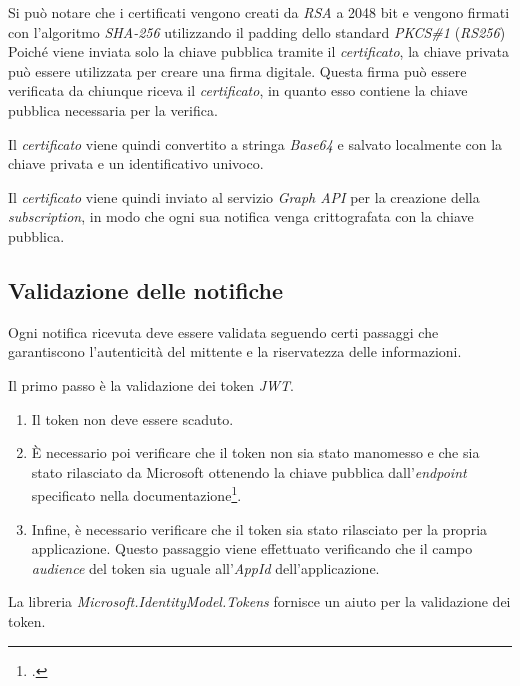 Si può notare che i certificati vengono creati da \emph{RSA} a 2048 bit e vengono firmati con l'algoritmo \emph{SHA-256} utilizzando il padding dello standard \emph{PKCS\#1} (\emph{RS256})
Poiché viene inviata solo la chiave pubblica tramite il \emph{certificato}, la chiave privata può essere utilizzata per creare una firma digitale.
Questa firma può essere verificata da chiunque riceva il \emph{certificato}, in quanto esso contiene la chiave pubblica necessaria per la verifica.

Il \emph{certificato} viene quindi convertito a stringa \emph{Base64} e salvato localmente con la chiave privata e un identificativo univoco.

Il \emph{certificato} viene quindi inviato al servizio \emph{Graph API} per la creazione della \emph{subscription}, in modo che ogni sua notifica venga crittografata con la chiave pubblica.

\subsection{Validazione delle notifiche}

Ogni notifica ricevuta deve essere validata seguendo certi passaggi che garantiscono l'autenticità del mittente e la riservatezza delle informazioni.

Il primo passo è la validazione dei token \emph{JWT}. 
\begin{enumerate}
	\item Il token non deve essere scaduto.
	\item È necessario poi verificare che il token non sia stato manomesso e che sia stato rilasciato da Microsoft ottenendo la chiave pubblica dall'\emph{endpoint} specificato nella documentazione\footcite{site:rich-notification}.
	\item Infine, è necessario verificare che il token sia stato rilasciato per la propria applicazione. Questo passaggio viene effettuato verificando che il campo \emph{audience} del token sia uguale all'\emph{AppId} dell'applicazione.
\end{enumerate}

\noindent La libreria \emph{Microsoft.IdentityModel.Tokens} fornisce un aiuto per la validazione dei token.

